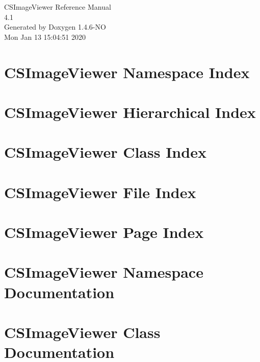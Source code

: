 \documentclass[a4paper]{book}
\begin{document}
\begin{titlepage}
\vspace*{7cm}
\begin{center}
{\Large CSImage\-Viewer Reference Manual\\[1ex]\large 4.1 }\\
\vspace*{1cm}
{\large Generated by Doxygen 1.4.6-NO}\\
\vspace*{0.5cm}
{\small Mon Jan 13 15:04:51 2020}\\
\end{center}
\end{titlepage}
\clearemptydoublepage
{}
\tableofcontents
\clearemptydoublepage
{}
\chapter{CSImage\-Viewer Namespace Index}

\chapter{CSImage\-Viewer Hierarchical Index}

\chapter{CSImage\-Viewer Class Index}

\chapter{CSImage\-Viewer File Index}

\chapter{CSImage\-Viewer Page Index}

\chapter{CSImage\-Viewer Namespace Documentation}









\chapter{CSImage\-Viewer Class Documentation}








\end{document}
